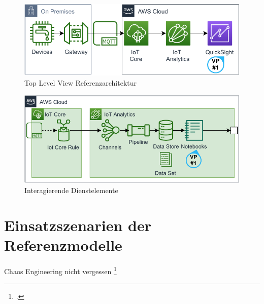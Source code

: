 \begin{figure}[H]
\centering
\includegraphics[width=\textwidth]{graphics/DB-RA-Overview.pdf}
\caption{Top Level View Referenzarchitektur}
\label{abb:TopLevelDBRA}
\end{figure}



\begin{figure}[H]
\centering
\includegraphics[width=\textwidth]{graphics/DB-RA-Elements.pdf}
\caption{Interagierende Dienstelemente}
\label{abb:ElementeDBRA}
\end{figure}

\section{Einsatzszenarien der Referenzmodelle}


Chaos Engineering nicht vergessen \footcite[Vgl.][]{Augsten.2020}